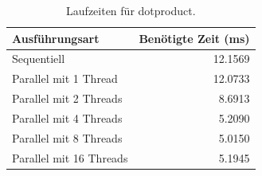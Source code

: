 \begin{table}[h]
\caption{Laufzeiten für dotproduct.}
\centering 
 \begin{tabular}{|l|r|}
  \textbf{Ausführungsart} & \textbf{Benötigte Zeit (ms)} \\ \hline
  Sequentiell & 12.1569 \\
  Parallel mit 1 Thread & 12.0733 \\
  Parallel mit 2 Threads & 8.6913 \\
  Parallel mit 4 Threads & 5.2090 \\
  Parallel mit 8 Threads & 5.0150 \\
  Parallel mit 16 Threads & 5.1945
 \end{tabular}
 \label{tab:aufgabe3_tab}
\end{table}
